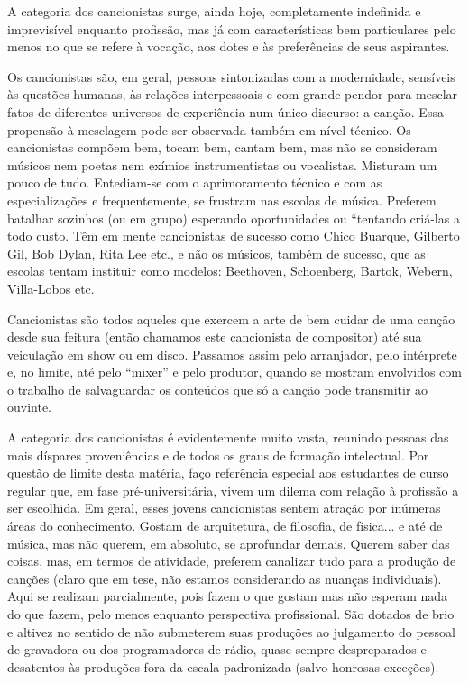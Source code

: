 A categoria dos cancionistas surge, ainda hoje, completamente indefinida
e imprevisível enquanto profissão, mas já com características bem
particulares pelo menos no que se refere à vocação, aos dotes e às
preferências de seus aspirantes.

Os cancionistas são, em geral, pessoas sintonizadas com a modernidade,
sensíveis às questões humanas, às relações interpessoais e com grande
pendor para mesclar fatos de diferentes universos de experiência num
único discurso: a canção. Essa propensão à mesclagem pode ser observada
também em nível técnico. Os cancionistas compõem bem, tocam bem, cantam
bem, mas não se consideram músicos nem poetas nem exímios
instrumentistas ou vocalistas. Misturam um pouco de tudo. Entediam-se
com o aprimoramento técnico e com as especializações e frequentemente,
se frustram nas escolas de música. Preferem batalhar sozinhos (ou em
grupo) esperando oportunidades ou ``tentando criá-las a todo custo. Têm
em mente cancionistas de sucesso como Chico Buarque, Gilberto Gil, Bob
Dylan, Rita Lee etc., e não os músicos, também de sucesso, que as
escolas tentam instituir como modelos: Beethoven, Schoenberg, Bartok,
Webern, Villa-Lobos etc.

Cancionistas são todos aqueles que exercem a arte de bem cuidar de uma
canção desde sua feitura (então chamamos este cancionista de compositor)
até sua veiculação em show ou em disco. Passamos assim pelo arranjador,
pelo intérprete e, no limite, até pelo ``mixer'' e pelo produtor, quando
se mostram envolvidos com o trabalho de salvaguardar os conteúdos que só
a canção pode transmitir ao ouvinte.

A categoria dos cancionistas é evidentemente muito vasta, reunindo
pessoas das mais díspares proveniências e de todos os graus de formação
intelectual. Por questão de limite desta matéria, faço referência
especial aos estudantes de curso regular que, em fase pré-universitária,
vivem um dilema com relação à profissão a ser escolhida. Em geral, esses
jovens cancionistas sentem atração por inúmeras áreas do conhecimento.
Gostam de arquitetura, de filosofia, de física... e até de música, mas
não querem, em absoluto, se aprofundar demais. Querem saber das coisas,
mas, em termos de atividade, preferem canalizar tudo para a produção de
canções (claro que em tese, não estamos considerando as nuanças
individuais). Aqui se realizam parcialmente, pois fazem o que gostam mas
não esperam nada do que fazem, pelo menos enquanto perspectiva
profissional. São dotados de brio e altivez no sentido de não submeterem
suas produções ao julgamento do pessoal de gravadora ou dos
programadores de rádio, quase sempre despreparados e desatentos às
produções fora da escala padronizada (salvo honrosas exceções).

